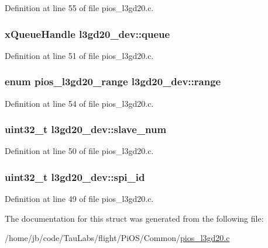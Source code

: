 \-Definition at line 55 of file pios\-\_\-l3gd20.\-c.

\hypertarget{structl3gd20__dev_afaf30977299d2f23c110c98529cf35f3}{
\subsubsection[{queue}]{\setlength{\rightskip}{0pt plus 5cm}x\-Queue\-Handle {\bf l3gd20\-\_\-dev\-::queue}}}\label{structl3gd20__dev_afaf30977299d2f23c110c98529cf35f3}


\-Definition at line 51 of file pios\-\_\-l3gd20.\-c.

\hypertarget{structl3gd20__dev_a76218293ab5447354c7f7f0b2772a8f3}{
\subsubsection[{range}]{\setlength{\rightskip}{0pt plus 5cm}enum {\bf pios\-\_\-l3gd20\-\_\-range} {\bf l3gd20\-\_\-dev\-::range}}}\label{structl3gd20__dev_a76218293ab5447354c7f7f0b2772a8f3}


\-Definition at line 54 of file pios\-\_\-l3gd20.\-c.

\hypertarget{structl3gd20__dev_a8bf2ef5a58b8a774ee762ff497ddcd91}{
\subsubsection[{slave\-\_\-num}]{\setlength{\rightskip}{0pt plus 5cm}uint32\-\_\-t {\bf l3gd20\-\_\-dev\-::slave\-\_\-num}}}\label{structl3gd20__dev_a8bf2ef5a58b8a774ee762ff497ddcd91}


\-Definition at line 50 of file pios\-\_\-l3gd20.\-c.

\hypertarget{structl3gd20__dev_a8d81d143afb3dd150d8302d4ffa9f1c5}{
\subsubsection[{spi\-\_\-id}]{\setlength{\rightskip}{0pt plus 5cm}uint32\-\_\-t {\bf l3gd20\-\_\-dev\-::spi\-\_\-id}}}\label{structl3gd20__dev_a8d81d143afb3dd150d8302d4ffa9f1c5}


\-Definition at line 49 of file pios\-\_\-l3gd20.\-c.



\-The documentation for this struct was generated from the following file\-:\begin{DoxyCompactItemize}
\item 
/home/jb/code/\-Tau\-Labs/flight/\-Pi\-O\-S/\-Common/\hyperlink{pios__l3gd20_8c}{pios\-\_\-l3gd20.\-c}\end{DoxyCompactItemize}
